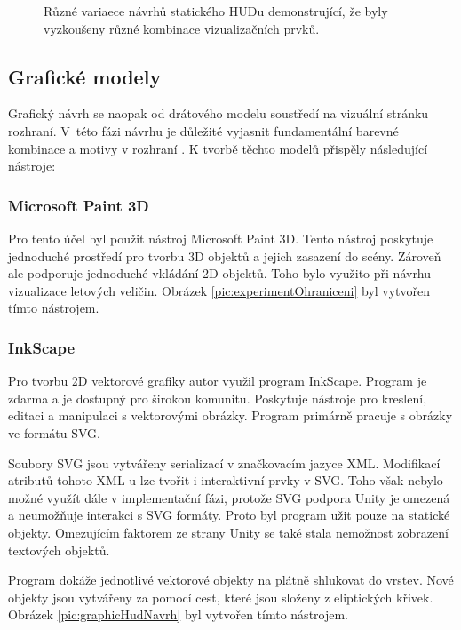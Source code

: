 \begin{figure}[H]
\begin{subfigure}[t]{0.53\linewidth}
    \end{subfigure}
    \caption{Různé variaece návrhů statického HUDu demonstrující, že byly vyzkoušeny různé kombinace vizualizačních prvků.}
    \label{fig:wire2}
\end{figure}

\newpage
\subsection{Grafické modely} %
Grafický návrh se naopak od drátového modelu soustředí na vizuální stránku rozhraní. V~této fázi návrhu je důležité vyjasnit fundamentální barevné kombinace a motivy v rozhraní \cite{KomárekJakub2022Nzps}. K tvorbě těchto modelů přispěly následující nástroje:

\subsubsection{Microsoft Paint 3D}
Pro tento účel byl použit nástroj Microsoft Paint 3D. Tento nástroj poskytuje jednoduché prostředí  pro tvorbu 3D objektů a jejich zasazení do scény. Zároveň ale podporuje jednoduché vkládání 2D objektů. Toho bylo využito při návrhu vizualizace letových veličin. Obrázek \ref{pic:experimentOhraniceni} byl vytvořen tímto nástrojem.
\subsubsection{InkScape} \label{PAR:InkScape}
Pro tvorbu 2D vektorové grafiky autor využil program InkScape.  Program je zdarma a je dostupný pro širokou komunitu. Poskytuje nástroje pro kreslení, editaci a manipulaci s vektorovými obrázky. Program primárně pracuje s obrázky ve formátu SVG. 

Soubory SVG jsou vytvářeny serializací v značkovacím jazyce XML. Modifikací atributů tohoto XML u lze tvořit i interaktivní prvky v SVG. Toho však nebylo možné využít dále v implementační fázi, protože SVG podpora Unity je omezená a  neumožňuje interakci s SVG formáty. Proto byl program užit pouze na statické objekty. Omezujícím faktorem ze strany Unity se také stala nemožnost zobrazení textových objektů.

Program dokáže jednotlivé vektorové objekty na plátně shlukovat do vrstev. Nové objekty jsou vytvářeny za pomocí cest, které jsou složeny z eliptických křivek. Obrázek \ref{pic:graphicHudNavrh} byl vytvořen tímto nástrojem.

